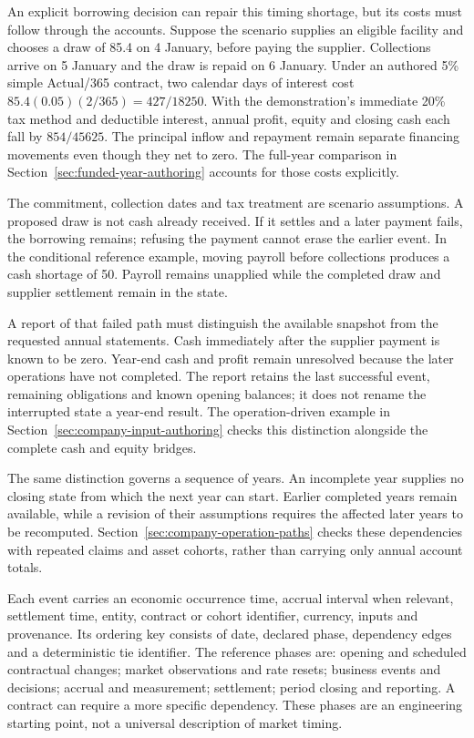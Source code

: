An explicit borrowing decision can repair this timing shortage, but its costs
must follow through the accounts. Suppose the scenario supplies an eligible
facility and chooses a draw of 85.4 on 4 January, before paying the supplier.
Collections arrive on 5 January and the draw is repaid on 6 January. Under an
authored 5\% simple Actual/365 contract, two calendar days of interest cost
\(85.4(0.05)(2/365)=427/18250\). With the demonstration's immediate 20\% tax
method and deductible interest, annual profit, equity and closing cash each
fall by \(854/45625\). The principal inflow and repayment remain separate
financing movements even though they net to zero. The full-year comparison
in Section~\ref{sec:funded-year-authoring} accounts for those costs explicitly.

The commitment, collection dates and tax treatment are scenario assumptions.
A proposed draw is not cash already received. If it settles and a later
payment fails, the borrowing remains; refusing the payment cannot erase the
earlier event. In the conditional reference example, moving payroll before
collections produces a cash shortage of 50. Payroll remains unapplied while
the completed draw and supplier settlement remain in the state.

A report of that failed path must distinguish the available snapshot from
the requested annual statements. Cash immediately after the supplier payment
is known to be zero. Year-end cash and profit remain unresolved because the
later operations have not completed. The report retains the last successful
event, remaining obligations and known opening balances; it does not rename
the interrupted state a year-end result. The operation-driven example in
Section~\ref{sec:company-input-authoring} checks this distinction alongside
the complete cash and equity bridges.

The same distinction governs a sequence of years. An incomplete year supplies
no closing state from which the next year can start. Earlier completed years
remain available, while a revision of their assumptions requires the affected
later years to be recomputed. Section~\ref{sec:company-operation-paths}
checks these dependencies with repeated claims and asset cohorts, rather than
carrying only annual account totals.

Each event carries an economic occurrence time, accrual interval when relevant,
settlement time, entity, contract or cohort identifier, currency, inputs and
provenance. Its ordering key consists of date, declared phase, dependency edges
and a deterministic tie identifier. The reference phases are: opening and
scheduled contractual changes; market observations and rate resets; business
events and decisions; accrual and measurement; settlement; period closing and
reporting. A contract can require a more specific dependency. These phases are
an engineering starting point, not a universal description of market timing.

